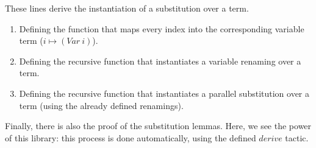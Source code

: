 These lines derive the instantiation of a substitution over a term.
\begin{enumerate}
\item Defining the function that maps every index into the corresponding variable term ($i \mapsto (Var \ i)$).
\item Defining the recursive function that instantiates a variable renaming over a term.
\item Defining the recursive function that instantiates a parallel substitution over a term (using the already defined renamings).
\end{enumerate}

Finally, there is also the proof of the substitution lemmas. 
Here, we see the power of this library: this process is done automatically, using the defined $derive$ tactic.

